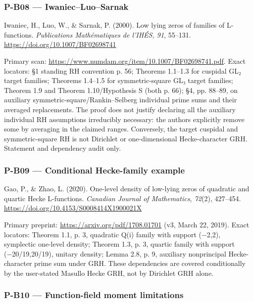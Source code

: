 \documentclass[11pt,a4paper]{article}
\theoremstyle{definition}\newtheorem{definition}{Definition}
\begin{document}
\subsubsection{P-B08 ---
Iwaniec--Luo--Sarnak}\label{p-b08--iwaniecluosarnak}

Iwaniec, H., Luo, W., \& Sarnak, P. (2000). Low lying zeros of families
of L-functions. \emph{Publications Mathématiques de l'IHÉS, 91},
55--131. \url{https://doi.org/10.1007/BF02698741}

Primary scan: \url{https://www.numdam.org/item/10.1007/BF02698741.pdf}.
Exact locators: §1 standing RH convention p. 56; Theorems 1.1--1.3 for
cuspidal GL₂ target families; Theorems 1.4--1.5 for symmetric-square GL₃
target families; Theorem 1.9 and Theorem 1.10/Hypothesis S (both p. 66);
§4, pp. 88--89, on auxiliary symmetric-square/Rankin--Selberg individual
prime sums and their averaged replacements. The proof does not justify
declaring all the auxiliary individual RH assumptions irreducibly
necessary: the authors explicitly remove some by averaging in the
claimed ranges. Conversely, the target cuspidal and symmetric-square RH
is not Dirichlet or one-dimensional Hecke-character GRH. Statement and
dependency audit only.

\subsubsection{P-B09 --- Conditional Hecke-family
example}\label{p-b09--conditional-hecke-family-example}

Gao, P., \& Zhao, L. (2020). One-level density of low-lying zeros of
quadratic and quartic Hecke L-functions. \emph{Canadian Journal of
Mathematics, 72}(2), 427--454.
\url{https://doi.org/10.4153/S0008414X1900021X}

Primary preprint: \url{https://arxiv.org/pdf/1708.01701} (v3, March 22,
2019). Exact locators: Theorem 1.1, p. 3, quadratic Q(i) family with
support (−2,2), symplectic one-level density; Theorem 1.3, p. 3, quartic
family with support (−20/19,20/19), unitary density; Lemma 2.8, p. 9,
auxiliary nonprincipal Hecke-character prime sum under GRH. These
dependencies are covered conditionally by the user-stated Masullo Hecke
GRH, not by Dirichlet GRH alone.

\subsubsection{P-B10 --- Function-field moment
limitations}\label{p-b10--function-field-moment-limitations}
\end{document}
